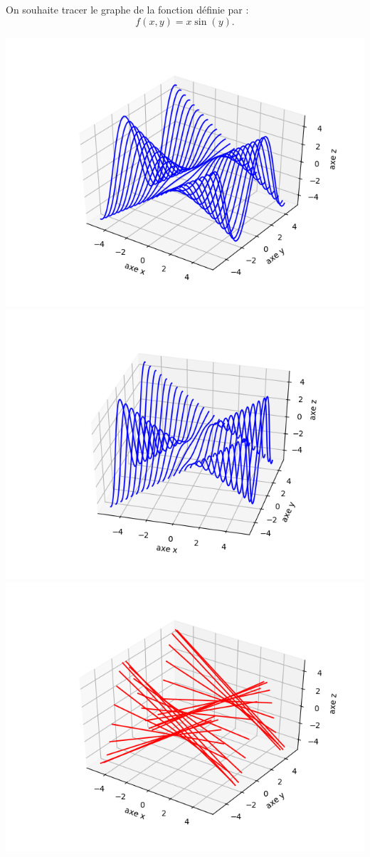 \documentclass[11pt,class=report,crop=false]{standalone}
\begin{document}
\begin{exemple}
On souhaite tracer le graphe de la fonction définie par :
$$f(x,y) = x \sin(y).$$

\begin{center}
\includegraphics[scale=\myscale,scale=0.5]{figures/fonctions-surface-2a}
\includegraphics[scale=\myscale,scale=0.5]{figures/fonctions-surface-2b}
\includegraphics[scale=\myscale,scale=0.5]{figures/fonctions-surface-2c}

\end{center}
\end{exemple}
\end{document}

